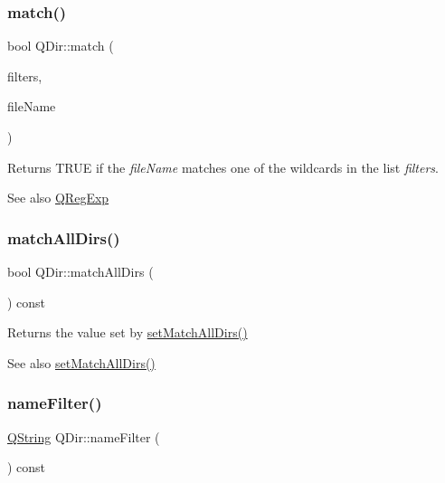 \subsubsection{\texorpdfstring{match()}{match()}\hspace{0.1cm}{\footnotesize\ttfamily [2/2]}}
{\footnotesize\ttfamily bool Q\+Dir\+::match (\begin{DoxyParamCaption}\item[{const \mbox{\hyperlink{class_q_string_list}{Q\+String\+List}} \&}]{filters,  }\item[{const \mbox{\hyperlink{class_q_string}{Q\+String}} \&}]{file\+Name }\end{DoxyParamCaption})\hspace{0.3cm}{\ttfamily [static]}}

Returns T\+R\+UE if the {\itshape file\+Name} matches one of the wildcards in the list {\itshape filters}. \begin{DoxySeeAlso}{See also}
\mbox{\hyperlink{class_q_reg_exp}{Q\+Reg\+Exp}} 
\end{DoxySeeAlso}
\mbox{\label{class_q_dir_a54bd9584a7c74412da7945ef57d895e0}} 
\subsubsection{\texorpdfstring{matchAllDirs()}{matchAllDirs()}}
{\footnotesize\ttfamily bool Q\+Dir\+::match\+All\+Dirs (\begin{DoxyParamCaption}{ }\end{DoxyParamCaption}) const\hspace{0.3cm}{\ttfamily [inline]}}

Returns the value set by \mbox{\hyperlink{class_q_dir_aec96bf79103196eefd2a38ff74aeadd0}{set\+Match\+All\+Dirs()}}

\begin{DoxySeeAlso}{See also}
\mbox{\hyperlink{class_q_dir_aec96bf79103196eefd2a38ff74aeadd0}{set\+Match\+All\+Dirs()}} 
\end{DoxySeeAlso}
\mbox{\label{class_q_dir_a6d71d046861c1728359a6119a1250a74}} 
\subsubsection{\texorpdfstring{nameFilter()}{nameFilter()}}
{\footnotesize\ttfamily \mbox{\hyperlink{class_q_string}{Q\+String}} Q\+Dir\+::name\+Filter (\begin{DoxyParamCaption}{ }\end{DoxyParamCaption}) const\hspace{0.3cm}{\ttfamily [inline]}}

